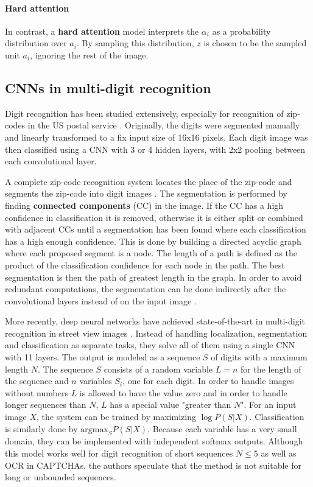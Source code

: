 \paragraph{Hard attention}
In contrast, a \textbf{hard attention} model interprets the $\alpha_i$ as a probability distribution over $a_i$. By sampling this distribution, $z$ is chosen to be the sampled unit $a_i$, ignoring the rest of the image.


\subsection{CNNs in multi-digit recognition}

Digit recognition has been studied extensively, especially for recognition of zip-codes in the US postal service \cite{lecun_1989, lecun_1990}. Originally, the digits were segmented manually and linearly transformed to a fix input size of 16x16 pixels.
Each digit image was then classified using a CNN with 3 or 4 hidden layers, with 2x2 pooling between each convolutional layer.

A complete zip-code recognition system locates the place of the zip-code and segments the zip-code into digit images \cite{zipcode_system}. The segmentation is performed by finding \textbf{connected components} (CC) in the image. If the CC has a high confidence in classification it is removed, otherwise it is either split or combined with adjacent CCs until a segmentation has been found where each classification has a high enough confidence. This is done by building a directed acyclic graph where each proposed segment is a node. The length of a path is defined as the product of the classification confidence for each node in the path. The best segmentation is then the path of greatest length in the graph. In order to avoid redundant computations, the segmentation can be done indirectly after the convolutional layers instead of on the input image \cite{lecun_multidigit}.

More recently, deep neural networks have achieved state-of-the-art in multi-digit recognition in street view images \cite{multidigit_streetview}. Instead of handling localization, segmentation and classification as separate tasks, they solve all of them using a single CNN with 11 layers. The output is modeled as a sequence $S$ of digits with a maximum length $N$. The sequence $S$ consists of a random variable $L=n$ for the length of the sequence and $n$ variables $S_i$, one for each digit. In order to handle images without numbers $L$ is allowed to have the value zero and in order to handle longer sequences than $N$, $L$ has a special value "greater than $N$". For an input image $X$, the system can be trained by maximizing $\log P(S \vert X)$. Classification is similarly done by $\text{argmax}_S P(S \vert X)$.
Because each variable has a very small domain, they can be implemented with independent softmax outputs.
Although this model works well for digit recognition of short sequences $N \leq 5$ as well as OCR in CAPTCHAs, the authors speculate that the method is not suitable for long or unbounded sequences.

